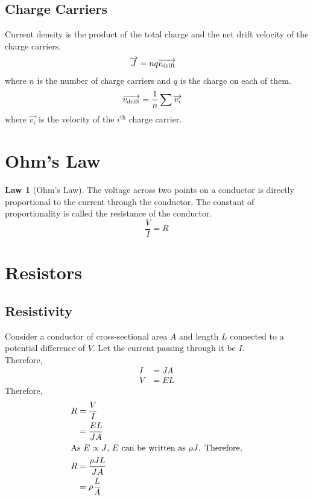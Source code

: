\documentclass[fleqn, a4paper, 12pt, twoside]{article}
\theoremstyle{definition}
\theoremstyle{theorem}
\newtheorem{law}{Law}
\begin{document}
\subsection{Charge Carriers}

Current density is the product of the total charge and the net drift velocity of the charge carriers.
\begin{align*}
	\overrightarrow{J} & = n q \overrightarrow{v_{\textnormal{drift}}}
\end{align*}
where $n$ is the number of charge carriers and $q$ is the charge on each of them.
\begin{align*}
	\overrightarrow{v_{\textnormal{drift}}} & = \frac{1}{n} \sum \overrightarrow{v_i}
\end{align*}
where $\overrightarrow{v_i}$ is the velocity of the $i^{\text{th}}$ charge carrier.

\section{Ohm's Law}

\begin{law}[Ohm's Law]
	The voltage across two points on a conductor is directly proportional to the current through the conductor.
	The constant of proportionality is called the resistance of the conductor.
	\begin{equation*}
		\frac{V}{I} = R
	\end{equation*}
	\label{Ohm's_Law}
\end{law}

\section{Resistors}

\subsection{Resistivity}

Consider a conductor of cross-sectional area $A$ and length $L$ connected to a potential difference of $V$.
Let the current passing through it be $I$.\\
Therefore,
\begin{align*}
	I & = J A \\
	V & = E L
\end{align*}
Therefore,
\begin{align*}
	R & = \frac{V}{I}          \\
          & = \frac{E L}{J A}      \\
	\intertext{As $E \propto J$, $E$ can be written as $\rho J$. Therefore,}
	R & = \frac{\rho J L}{J A} \\
          & = \rho \frac{L}{A}
\end{align*}
\end{document}
